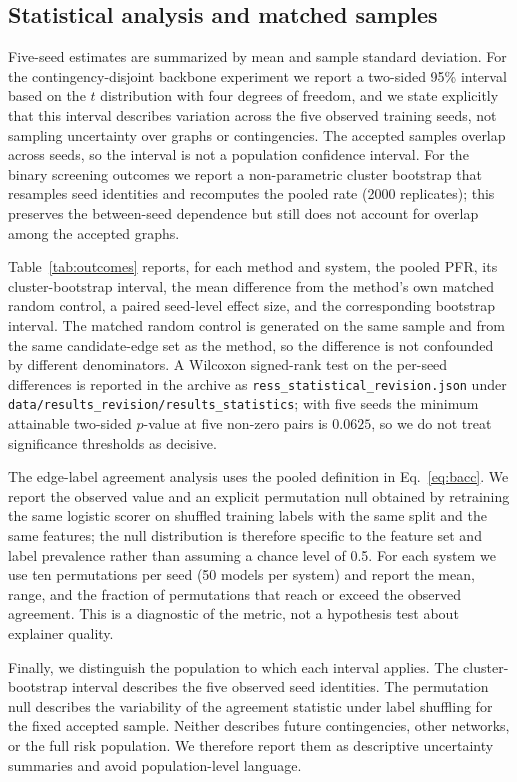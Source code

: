 \subsection{Statistical analysis and matched samples}\label{statistical_analysis}

Five-seed estimates are summarized by mean and sample standard deviation. For the contingency-disjoint backbone experiment we report a two-sided 95\% interval based on the $t$ distribution with four degrees of freedom, and we state explicitly that this interval describes variation across the five observed training seeds, not sampling uncertainty over graphs or contingencies. The accepted samples overlap across seeds, so the interval is not a population confidence interval. For the binary screening outcomes we report a non-parametric cluster bootstrap that resamples seed identities and recomputes the pooled rate (2000 replicates); this preserves the between-seed dependence but still does not account for overlap among the accepted graphs.

Table~\ref{tab:outcomes} reports, for each method and system, the pooled PFR, its cluster-bootstrap interval, the mean difference from the method's own matched random control, a paired seed-level effect size, and the corresponding bootstrap interval. The matched random control is generated on the same sample and from the same candidate-edge set as the method, so the difference is not confounded by different denominators. A Wilcoxon signed-rank test on the per-seed differences is reported in the archive as \texttt{ress\_statistical\_revision.json} under \texttt{data/results\_revision/results\_statistics}; with five seeds the minimum attainable two-sided $p$-value at five non-zero pairs is $0.0625$, so we do not treat significance thresholds as decisive.

The edge-label agreement analysis uses the pooled definition in Eq.~\eqref{eq:bacc}. We report the observed value and an explicit permutation null obtained by retraining the same logistic scorer on shuffled training labels with the same split and the same features; the null distribution is therefore specific to the feature set and label prevalence rather than assuming a chance level of 0.5. For each system we use ten permutations per seed (50 models per system) and report the mean, range, and the fraction of permutations that reach or exceed the observed agreement. This is a diagnostic of the metric, not a hypothesis test about explainer quality.

Finally, we distinguish the population to which each interval applies. The cluster-bootstrap interval describes the five observed seed identities. The permutation null describes the variability of the agreement statistic under label shuffling for the fixed accepted sample. Neither describes future contingencies, other networks, or the full risk population. We therefore report them as descriptive uncertainty summaries and avoid population-level language.

